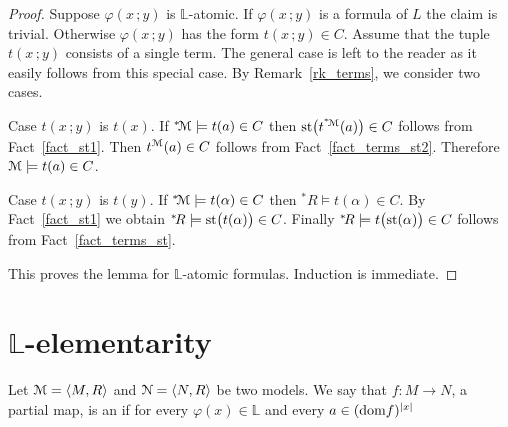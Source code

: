 \documentclass[11pt,oneside]{amsart}
\renewcommand*{\emph}[1]{%
   \smash{\tikz[baseline]\node[rectangle, fill=teal!25, rounded corners, inner xsep=0.5ex, inner ysep=0.2ex, anchor=base, minimum height = 2.7ex]{#1};}}
\begin{document}
\begin{proof}
  Suppose $\varphi(x\,;y)$ is $\mathds{L}$-atomic.
  If $\varphi(x\,;y)$ is a formula of $L$ the claim is trivial. 
  Otherwise $\varphi(x\,;y)$ has the form $t(x\,;y)\in C$.
  Assume that the tuple $t(x\,;y)$ consists of a single term.
  The general case is left to the reader as it easily follows from this special case. 
  By Remark~\ref{rk_terms}, we consider two cases.

  Case $t(x\,;y)$ is $t(x)$.  
  If ${}^*{\!\EuScript M}\models t(a)\in C$ then ${\rm st}\big(t^{{}^*{\!\EuScript M}}(a)\big)\in C$ follows from Fact~\ref{fact_st1}.
  Then $t^{\EuScript M}(a)\in C$ follows from Fact~\ref{fact_terms_st2}.
  Therefore ${\EuScript M}\models t(a)\in C$.

  Case $t(x\,;y)$ is $t(y)$.  
  If ${}^*{\!\EuScript M}\models t(\alpha)\in C$ then ${}^*\!R\models t(\alpha)\in C$.
  By Fact~\ref{fact_st1} we obtain ${}^*\!R\models {\rm st}\big(t(\alpha)\big)\in C$.
  Finally ${}^*\!R\models t\big({\rm st}(\alpha)\big)\in C$ follows from Fact~\ref{fact_terms_st}.



  
  This proves the lemma for $\mathds{L}$-atomic formulas.
  Induction is immediate. 
\end{proof}

\section{$\mathds{L}$-elementarity}

\def\ceq#1#2#3{\parbox[t]{35ex}{$\displaystyle #1$}\parbox{5ex}{\hfil $#2$}{$\displaystyle #3$}}

Let ${\EuScript M}=\langle M,R\rangle$ and ${\EuScript N}=\langle N,R\rangle$ be two models.
We say that $f:M\to N$, a partial map, is an \emph{$\mathds{L}$-elementary map\/} if for every $\varphi(x)\in\mathds{L}$ and every $a\in({\rm dom }f)^{|x|}$
\end{document}
